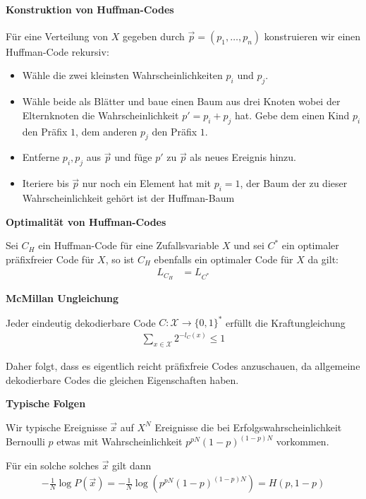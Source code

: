 \documentclass[25pt]{sciposter}
\newenvironment{defn}[1]{\begin{mdframed}[backgroundcolor=blue!10,innertopmargin=15pt, nobreak=true,innerbottommargin=15pt]
		\textbf{#1 }
	}
	{ 
	\end{mdframed}
}
\newenvironment{thm}[1]{\begin{mdframed}[nobreak=true,backgroundcolor=Emerald!10,innertopmargin=15pt, innerbottommargin=15pt]
		\textbf{#1 }
	}
	{ 
	\end{mdframed}
}
\begin{document}
\begin{multicols}{3}
\paragraph{Konstruktion von Huffman-Codes}
	Für eine Verteilung von $X$ gegeben durch $\vec{p} = (p_1,\ldots,p_n)$ konstruieren wir einen Huffman-Code rekursiv:
	\begin{itemize}
		\item Wähle die zwei kleinsten Wahrscheinlichkeiten $p_i$ und $p_j$.
		\item Wähle beide als Blätter und baue einen Baum aus drei Knoten wobei der Elternknoten die Wahrscheinlichkeit $p' = p_i + p_j$ hat. Gebe dem einen Kind $p_i$ den Präfix $1$, dem anderen $p_j$ den Präfix $1$.
		\item Entferne $p_i,p_j$ aus $\vec{p}$ und füge $p'$ zu $\vec{p}$ als neues Ereignis hinzu.
		\item Iteriere bis $\vec{p}$ nur noch ein Element hat mit $p_i = 1$, der Baum der zu dieser Wahrscheinlichkeit gehört ist der Huffman-Baum
	\end{itemize}


\begin{thm}{Optimalität von Huffman-Codes}
Sei ${C_H}$ ein Huffman-Code für eine Zufallsvariable $X$ und sei $C^*$ ein optimaler präfixfreier Code für $X$, so ist $C_H$ ebenfalls ein optimaler Code für $X$ da gilt:
\begin{align*}
	L_{C_H} &= L_{C^*}
\end{align*}
\end{thm}

\begin{thm}{McMillan Ungleichung}
Jeder eindeutig dekodierbare Code $C:\mathcal{X}\to \{0,1\}^*$ erfüllt die Kraftungleichung
\begin{align*}
	\sum_{x\in\mathcal{X}} 2^{-l_C (x)} \leq 1
\end{align*}
\end{thm}

Daher folgt, dass es eigentlich reicht präfixfreie Codes anzuschauen, da allgemeine dekodierbare Codes die gleichen Eigenschaften haben.


\begin{defn}{Typische Folgen}
	Wir typische Ereignisse $\vec{x}$ auf $X^N$ Ereignisse die bei Erfolgswahrscheinlichkeit Bernoulli $p$ etwas mit Wahrscheinlichkeit $p^{pN} (1-p)^{(1-p)N}$ vorkommen.
	
	Für ein solche solches $\vec{x}$ gilt dann
	\begin{align*}
		-\frac{1}{N} \log P(\vec{x}) = - \frac{1}{N} \log \left( p^{pN} (1-p)^{(1-p)N}\right) = H(p,1-p)
	\end{align*} 
\end{defn}



\end{multicols}
\end{document}
